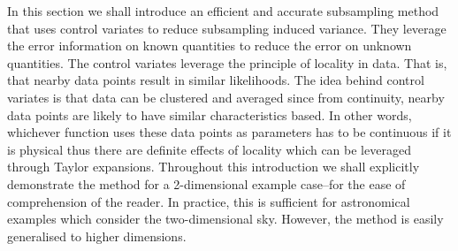In this section we shall introduce an efficient and accurate subsampling method that uses control variates to reduce subsampling induced variance. They leverage the error information on known quantities to reduce the error on unknown quantities. The control variates leverage the principle of locality in data. That is, that nearby data points result in similar likelihoods. The idea behind control variates is that data can be clustered and averaged since from continuity, nearby data points are likely to have similar characteristics based. In other words, whichever function uses these data points as parameters has to be continuous if it is physical thus there are definite effects of locality which can be leveraged through Taylor expansions. Throughout this introduction we shall explicitly demonstrate the method for a 2-dimensional example case--for the ease of comprehension of the reader. In practice, this is sufficient for astronomical examples which consider the two-dimensional sky. However, the method is easily generalised to higher dimensions.


